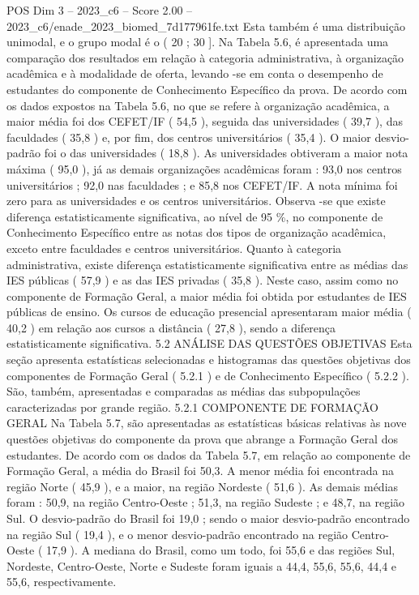 \begin{textsample}{POS Dim 3 – 2023\_c6 – Score 2.00 – 2023\_c6/enade\_2023\_biomed\_7d177961fe.txt}
Esta também é uma distribuição unimodal, e o grupo modal é o ( 20 ; 30 ].
Na Tabela 5.6, é apresentada uma comparação dos resultados em relação à categoria administrativa, à organização acadêmica e à modalidade de oferta, levando -se em conta o desempenho de estudantes do componente de Conhecimento Específico da prova.
De acordo com os dados expostos na Tabela 5.6, no que se refere à organização acadêmica, a maior média foi dos CEFET/IF ( 54,5 ), seguida das universidades ( 39,7 ), das faculdades ( 35,8 ) e, por fim, dos centros universitários ( 35,4 ).
O maior desvio-padrão foi o das universidades ( 18,8 ).
As universidades obtiveram a maior nota máxima ( 95,0 ), já as demais organizações acadêmicas foram : 93,0 nos centros universitários ; 92,0 nas faculdades ; e 85,8 nos CEFET/IF.
A nota mínima foi zero para as universidades e os centros universitários.
Observa -se que existe diferença estatisticamente significativa, ao nível de 95 \%, no componente de Conhecimento Específico entre as notas dos tipos de organização acadêmica, exceto entre faculdades e centros universitários.
Quanto à categoria administrativa, existe diferença estatisticamente significativa entre as médias das IES públicas ( 57,9 ) e as das IES privadas ( 35,8 ).
Neste caso, assim como no componente de Formação Geral, a maior média foi obtida por estudantes de IES públicas de ensino.
Os cursos de educação presencial apresentaram maior média ( 40,2 ) em relação aos cursos a distância ( 27,8 ), sendo a diferença estatisticamente significativa. 5.2 ANÁLISE DAS QUESTÕES OBJETIVAS Esta seção apresenta estatísticas selecionadas e histogramas das questões objetivas dos componentes de Formação Geral ( 5.2.1 ) e de Conhecimento Específico ( 5.2.2 ).
São, também, apresentadas e comparadas as médias das subpopulações caracterizadas por grande região. 5.2.1 COMPONENTE DE FORMAÇÃO GERAL Na Tabela 5.7, são apresentadas as estatísticas básicas relativas às nove questões objetivas do componente da prova que abrange a Formação Geral dos estudantes.
De acordo com os dados da Tabela 5.7, em relação ao componente de Formação Geral, a média do Brasil foi 50,3.
A menor média foi encontrada na região Norte ( 45,9 ), e a maior, na região Nordeste ( 51,6 ).
As demais médias foram : 50,9, na região Centro-Oeste ; 51,3, na região Sudeste ; e 48,7, na região Sul.
O desvio-padrão do Brasil foi 19,0 ; sendo o maior desvio-padrão encontrado na região Sul ( 19,4 ), e o menor desvio-padrão encontrado na região Centro-Oeste ( 17,9 ).
A mediana do Brasil, como um todo, foi 55,6 e das regiões Sul, Nordeste, Centro-Oeste, Norte e Sudeste foram iguais a 44,4, 55,6, 55,6, 44,4 e 55,6, respectivamente.

\end{textsample}
